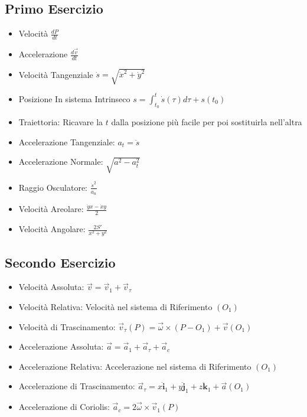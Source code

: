 \documentclass[11pt,a4paper,twoside]{article}
\theoremstyle{definition}
\begin{document}
\subsection*{Primo Esercizio}

\begin{itemize}
	\item Velocità $\displaystyle{\frac{dP}{dt}}$
	\item Accelerazione $\displaystyle{\frac{d\vec v}{dt}}$
	\item Velocità Tangenziale $\displaystyle{\dot s = \sqrt{\dot x^2 + \dot y^2}}$
	\item Posizione In sistema Intrinseco $\displaystyle{s = \int_{t_0}^t \dot s(\tau) d\tau + s(t_0)}$
	\item Traiettoria: Ricavare la $t$ dalla posizione più facile per poi sostituirla nell'altra
	\item Accelerazione Tangenziale: $a_t = \ddot s$
	\item Accelerazione Normale: $\displaystyle{\sqrt{a^2 - a_t^2}}$
	\item Raggio Osculatore: $\displaystyle{\frac{\dot s^2}{a_n}}$
	\item Velocità Areolare: $\displaystyle{\frac{\dot y x - \dot x y}{2}}$
	\item Velocità Angolare: $\displaystyle{\frac{2S'}{x^2 + y^2}}$
\end{itemize}

\subsection*{Secondo Esercizio}

\begin{itemize}
	\item Velocità Assoluta: $\vec v = \vec v_1 + \vec v_\tau$
	\item Velocità Relativa: Velocità nel sistema di Riferimento $(O_1)$
	\item Velocità di Trascinamento: $\vec v_\tau(P) = \vec \omega \times (P-O_1) + \vec v(O_1)$
	\item Accelerazione Assoluta: $\vec a = \vec a_1 + \vec a_\tau + \vec a_c$
	\item Accelerazione Relativa: Accelerazione nel sistema di Riferimento $(O_1)$
	\item Accelerazione di Trascinamento: $\vec a_\tau = x \ddot{\mathbf i}_1 + y \ddot{\mathbf j}_1 + z \ddot{\mathbf k}_1 + \vec a(O_1)$
	\item Accelerazione di Coriolis: $\vec a_c = 2\vec \omega \times \vec v_1(P)$
\end{itemize}
\end{document}
